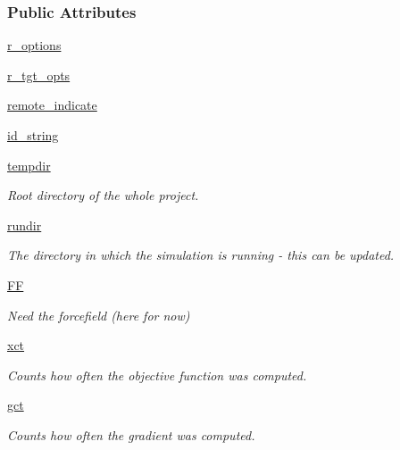\subsubsection*{\-Public \-Attributes}
\begin{DoxyCompactItemize}
\item 
\hyperlink{classforcebalance_1_1target_1_1RemoteTarget_a55f79d109555cbb63f6b332009a1bf9d}{r\-\_\-options}
\item 
\hyperlink{classforcebalance_1_1target_1_1RemoteTarget_a281a3bd11be2fe3d78d804d0708004f4}{r\-\_\-tgt\-\_\-opts}
\item 
\hyperlink{classforcebalance_1_1target_1_1RemoteTarget_a43b4e2f91fc38e2062b9f3623b34a0a4}{remote\-\_\-indicate}
\item 
\hyperlink{classforcebalance_1_1target_1_1RemoteTarget_a5c0aec85fdf529eaa82a087d6680f7f4}{id\-\_\-string}
\item 
\hyperlink{classforcebalance_1_1target_1_1Target_aede2856573b890cd47054ad36937d6f6}{tempdir}
\begin{DoxyCompactList}\small\item\em \-Root directory of the whole project. \end{DoxyCompactList}\item 
\hyperlink{classforcebalance_1_1target_1_1Target_a1da470037ef61c22dc44beb85cfa01a9}{rundir}
\begin{DoxyCompactList}\small\item\em \-The directory in which the simulation is running -\/ this can be updated. \end{DoxyCompactList}\item 
\hyperlink{classforcebalance_1_1target_1_1Target_a796dc30a19a60c63fb43b088d40a963f}{\-F\-F}
\begin{DoxyCompactList}\small\item\em \-Need the forcefield (here for now) \end{DoxyCompactList}\item 
\hyperlink{classforcebalance_1_1target_1_1Target_ad4cd0ab38d8fc97d3e7a6e22ce130a16}{xct}
\begin{DoxyCompactList}\small\item\em \-Counts how often the objective function was computed. \end{DoxyCompactList}\item 
\hyperlink{classforcebalance_1_1target_1_1Target_aff6e42b84dd8eb5a4dc3b47aa58bc64c}{gct}
\begin{DoxyCompactList}\small\item\em \-Counts how often the gradient was computed. \end{DoxyCompactList}\item 

\end{DoxyCompactItemize}
